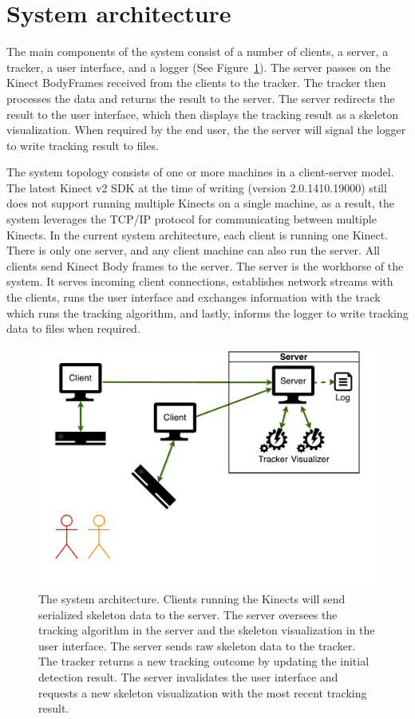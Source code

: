 \section{System architecture}
\label{sec:design_architecture}

The main components of the system consist of a number of clients, a server, a tracker, a user interface, and a logger (See Figure~\ref{fig:system_architecture}). The server passes on the Kinect BodyFrames received from the clients to the tracker. The tracker then processes the data and returns the result to the server. The server redirects the result to the user interface, which then displays the tracking result as a skeleton visualization. When required by the end user, the the server will signal the logger to write tracking result to files.

The system topology consists of one or more machines in a client-server model. The latest Kinect v2 SDK at the time of writing (version 2.0.1410.19000) still does not support running multiple Kinects on a single machine, as a result, the system leverages the TCP/IP protocol for communicating between multiple Kinects. In the current system architecture, each client is running one Kinect. There is only one server, and any client machine can also run the server. All clients send Kinect Body frames to the server. The server is the workhorse of the system. It serves incoming client connections, establishes network streams with the clients, runs the user interface and exchanges information with the track which runs the tracking algorithm, and lastly, informs the logger to write tracking data to files when required.

\begin{figure}[!h]
  \centering

  \includegraphics[width=0.8\linewidth]{figs/system_architecture}
  
  \caption{The system architecture. Clients running the Kinects will send serialized skeleton data to the server. The server oversees the tracking algorithm in the server and the skeleton visualization in the user interface. The server sends raw skeleton data to the tracker. The tracker returns a new tracking outcome by updating the initial detection result. The server invalidates the user interface and requests a new skeleton visualization with the most recent tracking result.}
  
  \label{fig:system_architecture}
\end{figure}


